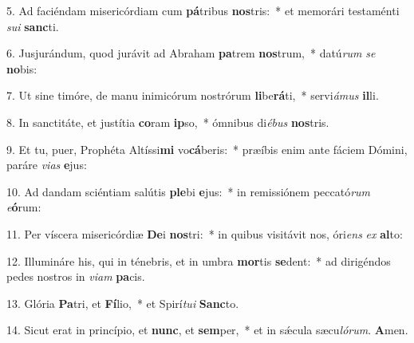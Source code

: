 5. Ad faciéndam misericórdiam cum \textbf{pá}tribus \textbf{nos}tris:~* et memorári testaménti \textit{su}\textit{i} \textbf{sanc}ti.

6. Jusjurándum, quod jurávit ad Abraham \textbf{pa}trem \textbf{nos}trum,~* datú\textit{rum} \textit{se} \textbf{no}bis:

7. Ut sine timóre, de manu inimicórum nostrórum \textbf{li}be\textbf{rá}ti,~* servi\textit{á}\textit{mus} \textbf{il}li.

8. In sanctitáte, et justítia \textbf{co}ram \textbf{ip}so,~* ómnibus di\textit{é}\textit{bus} \textbf{nos}tris.

9. Et tu, puer, Prophéta Altíssi\textbf{mi} vo\textbf{cá}beris:~* præíbis enim ante fáciem Dómini, paráre \textit{vi}\textit{as} \textbf{e}jus:

10. Ad dandam sciéntiam salútis \textbf{ple}bi \textbf{e}jus:~* in remissiónem peccató\textit{rum} \textit{e}\textbf{ó}rum:

11. Per víscera misericórdiæ \textbf{De}i \textbf{nos}tri:~* in quibus visitávit nos, óri\textit{ens} \textit{ex} \textbf{al}to:

12. Illumináre his, qui in ténebris, et in umbra \textbf{mor}tis \textbf{se}dent:~* ad dirigéndos pedes nostros in \textit{vi}\textit{am} \textbf{pa}cis.

13. Glória \textbf{Pa}tri, et \textbf{Fí}lio,~* et Spirí\textit{tu}\textit{i} \textbf{Sanc}to.

14. Sicut erat in princípio, et \textbf{nunc}, et \textbf{sem}per,~* et in s\'{\ae}cula sæcu\textit{ló}\textit{rum}. \textbf{A}men.